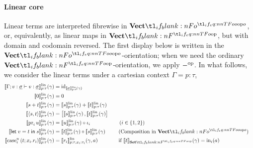 \documentclass[11pt,a4paper]{article}
\theoremstyle{definition}
\theoremstyle{remark}
\providecommand{\id}{\mathrm{id}}
\providecommand{\blankdash}{\mathord{-}}
\providecommand{\letst}[3]{\mathsf{let}\;#1=#2\;\mathsf{in}\;#3}
\providecommand{\lintype}[1]{\underline{#1}}
\providecommand{\setint}[1]{\llbracket #1\rrbracket_{\Set}}
\providecommand{\linint}[2]{\llbracket #1\rrbracket_{#2}^{\mathrm{lin}}}
\begin{document}
\paragraph{Linear core}
Linear terms are interpreted fibrewise in \( \Vect[o] \), or, equivalently, as linear maps in \( \Vect \), but with domain and codomain reversed. The first display below is written in the \(\Vect[o]\)-orientation; when we need the ordinary \(\Vect\)-orientation, we apply \(\opmor{\blankdash}\). In what follows, we consider the linear terms under a cartesian context \( \Gamma = p : \tau \),
{
  \allowdisplaybreaks
  \begin{alignat*}{2}
    \fn[n]{
    \linint{
    \Gamma; v : \lintype{\sigma}
    \vdash v : \lintype{\sigma}
    }{p : \tau}
    }{ \gamma }
    &=
      \id_{
      \Fun[np]{
      \linint{
      \lintype{\sigma}
      }{p : \tau}
      }{ \gamma }
      }
    \\
    \fn[n]{
    \linint{
    \opn[b]{0}
    }{p : \tau}
    }{ \gamma }
    &= 0
    \\
    \fn[n]{
    \linint{
    s + t
    }{p : \tau}
    }{ \gamma }
    &=
      \fn[n]{
      \linint{
      s
      }{p : \tau}
      }{ \gamma }
      +
      \fn[n]{
      \linint{
      t
      }{p : \tau}
      }{ \gamma }
    \\
    \fn[n]{
    \linint{
    \tuple{ s, t }
    }{p : \tau}
    }{ \gamma }
    &=
      \cotupling{
      \fn[n]{
      \linint{
      s
      }{p : \tau}
      }{ \gamma },
      \fn[n]{
      \linint{
      t
      }{p : \tau}
      }{ \gamma }
      }
    \\
    \fn[n]{
    \linint{
    \opn[b]{pr}_{i} u
    }{p : \tau}
    }{ \gamma }
    &=
      \fn[n]{
      \linint{
      u
      }{p : \tau}
      }{ \gamma }
      \circ
      \iota_{i}
      &&
      \quad
      \left( i \in \left\{ 1, 2 \right\} \right) 
    \\
    \fn[n]{
    \linint{
    \letst{v}{t}{s}
    }{p : \tau}
    }{ \gamma }
    &=
      \fn[n]{ \linint{t}{p : \tau} }{ \gamma }
      \circ
      \fn[n]{ \linint{s}{p : \tau} }{ \gamma }
      &&
      \quad
      \text{(Composition in \( \Vect[o] \))}
    \\
    \fn[n]{
    \linint{
    \casenst{t}{i}{n}{x_{i}}{r_{i}}
    }{p : \tau}
    }{ \gamma }
    &=
      \fn[n]{ \linint{r_{i}}{p : \tau, x_{i} : \tau_{i}} }{ \gamma, a }
      &&
      \quad
      \text{if }
         \fn[n]{ \setint{t} }{ \gamma } = \fn[n]{ \opn[b]{in}_{i} }{ a }
  \end{alignat*}
}
\end{document}
